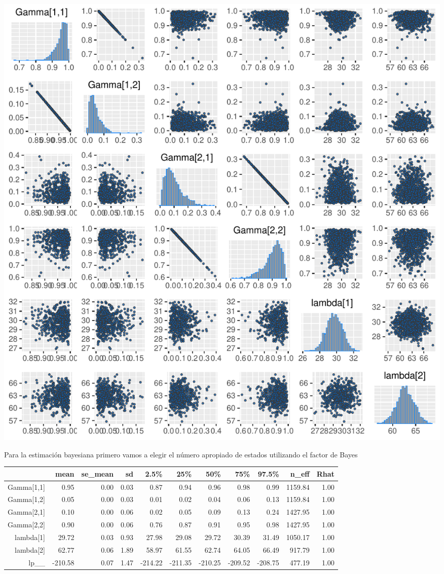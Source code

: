 \documentclass[a4paper]{article}\usepackage[]{graphicx}\usepackage[]{color}
\makeatletter
\def\maxwidth{ %
  \ifdim\Gin@nat@width>\linewidth
    \linewidth
  \else
    \Gin@nat@width
  \fi
}
\newenvironment{knitrout}{}{} %
\makeatother
\begin{document}
\begin{knitrout}
\color{fgcolor}
\includegraphics[width=\maxwidth]{figure/unnamed-chunk-25-1} 

\end{knitrout}


Para la estimación bayesiana primero vamos a elegir el número apropiado de estados utilizando el factor de Bayes



\begin{table}[ht]
\centering
\begin{tabular}{rrrrrrrrrrr}
  \hline
 & mean & se\_mean & sd & 2.5\% & 25\% & 50\% & 75\% & 97.5\% & n\_eff & Rhat \\ 
  \hline
Gamma[1,1] & 0.95 & 0.00 & 0.03 & 0.87 & 0.94 & 0.96 & 0.98 & 0.99 & 1159.84 & 1.00 \\ 
  Gamma[1,2] & 0.05 & 0.00 & 0.03 & 0.01 & 0.02 & 0.04 & 0.06 & 0.13 & 1159.84 & 1.00 \\ 
  Gamma[2,1] & 0.10 & 0.00 & 0.06 & 0.02 & 0.05 & 0.09 & 0.13 & 0.24 & 1427.95 & 1.00 \\ 
  Gamma[2,2] & 0.90 & 0.00 & 0.06 & 0.76 & 0.87 & 0.91 & 0.95 & 0.98 & 1427.95 & 1.00 \\ 
  lambda[1] & 29.72 & 0.03 & 0.93 & 27.98 & 29.08 & 29.72 & 30.39 & 31.49 & 1050.17 & 1.00 \\ 
  lambda[2] & 62.77 & 0.06 & 1.89 & 58.97 & 61.55 & 62.74 & 64.05 & 66.49 & 917.79 & 1.00 \\ 
  lp\_\_ & -210.58 & 0.07 & 1.47 & -214.22 & -211.35 & -210.25 & -209.52 & -208.75 & 477.19 & 1.00 \\ 
   \hline
\end{tabular}
\end{table}
\end{document}
